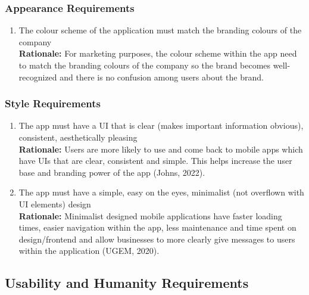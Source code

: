 \documentclass[]{article}
\begin{document}
\subsubsection{Appearance Requirements}
\label{ssub:appearance_requirements}
\begin{enumerate}[{LF-A}1. ]
	\item The colour scheme of the application must match the branding colours of the company \\
	{\bf Rationale:} For marketing purposes, the colour scheme within the app need to match the branding colours of the company so the brand becomes well-recognized and there is no confusion among users about the brand.
\end{enumerate}

\subsubsection{Style Requirements}
\label{ssub:style_requirements}
\begin{enumerate}[{LF-S}1. ]
	\item The app must have a UI that is clear (makes important information obvious), consistent, aesthetically pleasing \\
	{\bf Rationale:} Users are more likely to use and come back to mobile apps which have UIs that are clear, consistent and simple. This helps increase the user base and branding power of the app (Johns, 2022). 
	\item The app must have a simple, easy on the eyes, minimalist (not overflown with UI elements) design \\
	{\bf Rationale:} Minimalist designed mobile applications have faster loading times, easier navigation within the app, less maintenance and time spent on design/frontend and allow businesses to more clearly give messages to users within the application (UGEM, 2020).
\end{enumerate}


\subsection{Usability and Humanity Requirements}
\label{sub:usability_and_humanity_requirements}
\end{document}
